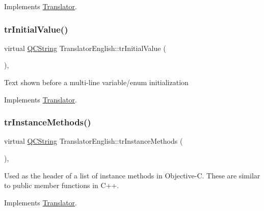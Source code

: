 Implements \mbox{\hyperlink{class_translator}{Translator}}.

\mbox{\label{class_translator_english_a045ea0d992445cec329bdc502da27197}} 
\subsubsection{\texorpdfstring{trInitialValue()}{trInitialValue()}}
{\footnotesize\ttfamily virtual \mbox{\hyperlink{class_q_c_string}{Q\+C\+String}} Translator\+English\+::tr\+Initial\+Value (\begin{DoxyParamCaption}{ }\end{DoxyParamCaption})\hspace{0.3cm}{\ttfamily [inline]}, {\ttfamily [virtual]}}

Text shown before a multi-\/line variable/enum initialization 

Implements \mbox{\hyperlink{class_translator}{Translator}}.

\mbox{\label{class_translator_english_a786b9300d1be72a483d921103e61214d}} 
\subsubsection{\texorpdfstring{trInstanceMethods()}{trInstanceMethods()}}
{\footnotesize\ttfamily virtual \mbox{\hyperlink{class_q_c_string}{Q\+C\+String}} Translator\+English\+::tr\+Instance\+Methods (\begin{DoxyParamCaption}{ }\end{DoxyParamCaption})\hspace{0.3cm}{\ttfamily [inline]}, {\ttfamily [virtual]}}

Used as the header of a list of instance methods in Objective-\/C. These are similar to public member functions in C++. 

Implements \mbox{\hyperlink{class_translator}{Translator}}.

\mbox{\label{class_translator_english_a376a3eb016a5630742ac37d07584a821}} 
